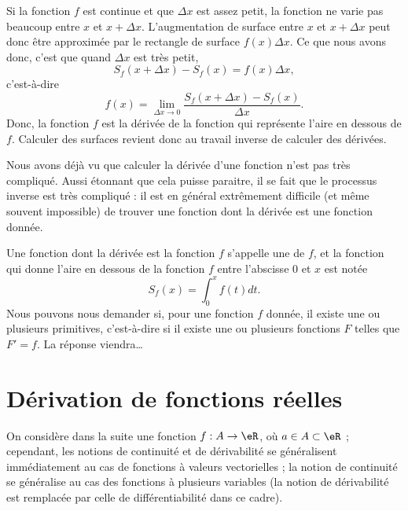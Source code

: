 Si la fonction $f$ est continue et que $\Delta x$ est assez petit, la fonction ne varie pas beaucoup entre $x$ et $x+\Delta x$. L'augmentation de surface entre $x$ et $x+\Delta x$ peut donc être approximée par le rectangle de surface $f(x)\Delta x$. Ce que nous avons donc, c'est que quand $\Delta x$ est très petit,
\begin{equation}
	S_f(x+\Delta x)-S_f(x)=f(x)\Delta x,
\end{equation}
c'est-à-dire
\begin{equation}
	f(x)=\lim_{\Delta x\to 0}\frac{  S_f(x+\Delta x)-S_f(x)}{ \Delta x }.
\end{equation}
Donc, la fonction $f$ est la dérivée de la fonction qui représente l'aire en dessous de $f$. Calculer des surfaces revient donc au travail inverse de calculer des dérivées.

Nous avons déjà vu que calculer la dérivée d'une fonction n'est pas très compliqué. Aussi étonnant que cela puisse paraitre, il se fait que le processus inverse est très compliqué : il est en général extrêmement difficile (et même souvent impossible) de trouver une fonction dont la dérivée est une fonction donnée.

Une fonction dont la dérivée est la fonction $f$ s'appelle une  de $f$, et la fonction qui donne l'aire en dessous de la fonction $f$ entre l'abscisse $0$ et $x$ est notée
\begin{equation}
	S_f(x)=\int_0^xf(t)dt.
\end{equation}
Nous pouvons nous demander si, pour une fonction $f$ donnée, il existe une ou plusieurs primitives, c'est-à-dire si il existe une ou plusieurs fonctions $F$ telles que $F'=f$. La réponse viendra\ldots

\section{Dérivation de fonctions réelles}
\label{seccontetderiv}

On considère dans la suite une fonction $f : A \to \eR$, où $a \in A \subset \eR$ ; cependant, les notions de continuité et de dérivabilité se généralisent immédiatement au cas de fonctions à valeurs vectorielles ; la notion de continuité se généralise au cas des fonctions à plusieurs variables (la notion de dérivabilité est remplacée par celle de différentiabilité dans ce cadre).

